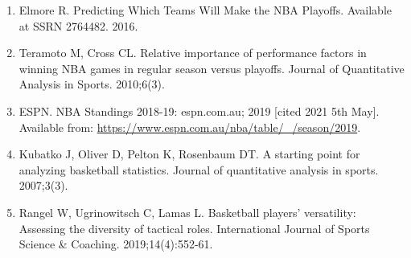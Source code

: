 \documentclass[
]{article}
\providecommand{\tightlist}{%
  \setlength{\itemsep}{0pt}\setlength{\parskip}{0pt}}
\begin{document}
\begin{enumerate}
\def\labelenumi{\arabic{enumi}.}
\tightlist
\item
  Elmore R. Predicting Which Teams Will Make the NBA Playoffs. Available
  at SSRN 2764482. 2016.
\item
  Teramoto M, Cross CL. Relative importance of performance factors in
  winning NBA games in regular season versus playoffs. Journal of
  Quantitative Analysis in Sports. 2010;6(3).
\item
  ESPN. NBA Standings 2018-19: espn.com.au; 2019 {[}cited 2021 5th
  May{]}. Available from:
  \url{https://www.espn.com.au/nba/table/_/season/2019}.
\item
  Kubatko J, Oliver D, Pelton K, Rosenbaum DT. A starting point for
  analyzing basketball statistics. Journal of quantitative analysis in
  sports. 2007;3(3).
\item
  Rangel W, Ugrinowitsch C, Lamas L. Basketball players' versatility:
  Assessing the diversity of tactical roles. International Journal of
  Sports Science \& Coaching. 2019;14(4):552-61.
\end{enumerate}
\end{document}
